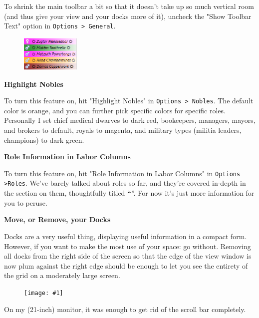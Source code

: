 \documentclass[]{article}
\newcommand{\jump}[1] {\textbf{``\nameref{sec:#1}}''}
\newcommand{\fullfigure}[1] {
\begin{figure}[h!]
\texttt{[image: \#1]}
\end{figure}
}
\newcommand{\fullfigurecaption}[1] {
\begin{center}
\vspace{-12pt}
#1
\end{center}
}
\begin{document}
To shrink the main toolbar a bit so that it doesn't take up so much vertical room (and thus give your
view and your docks more of it), uncheck the "Show Toolbar Text" option in \texttt{Options > General}.
\vspace{12pt}

\begin{figure}\vspace{-20pt}
  \begin{center}
    \includegraphics[width=0.25\textwidth]{Sec2Fig25}
  \end{center}
\vspace{-15pt}
\end{figure}
\noindent \textbf{Highlight Nobles}

To turn this feature on, hit "Highlight Nobles" in \texttt{Options > Nobles}. The default color is
orange, and you can further pick specific colors for specific roles. Personally I set chief medical
dwarves to dark red, bookeepers, managers, mayors, and brokers to default, royals to magenta, and
military types (militia leaders, champions) to dark green.
\vspace{12pt}

\noindent \textbf{Role Information in Labor Columns}

To turn this feature on, hit "Role Information in Labor Columns" in \texttt{Options >Roles}. We've barely
talked about roles so far, and they're covered in-depth in the section on them, thoughtfully titled
\jump{Roles}. For now it's just more information for you to peruse.\
\vspace{12pt}

\noindent \textbf{Move, or Remove, your Docks}

Docks are a very useful thing, displaying useful information in a compact form. However, if you want to
make the most use of your space: go without. Removing all docks from the right side of the screen so that
the edge of the view window is now plum against the right edge should be enough to let you see the
entirety of the grid on a moderately large screen.

\fullfigure{Sec2Fig26}
\fullfigurecaption{On my (21-inch) monitor, it was enough to get rid of the scroll bar completely.}
\end{document}
